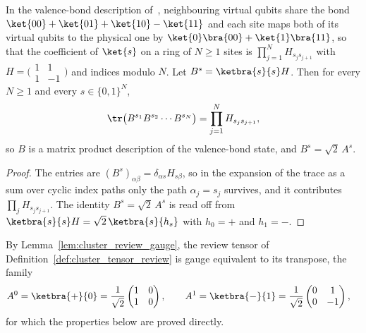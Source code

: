 \begin{lemma}\label{lem:cluster_valence_bond}
    \leanok
    In the valence-bond description of~\cite{VerstraeteCirac2004ValenceBond},
    neighbouring virtual qubits share the bond
    $\ket{00} + \ket{01} + \ket{10} - \ket{11}$ and each site maps both of its
    virtual qubits to the physical one by
    $\ket{0}\bra{00} + \ket{1}\bra{11}$, so that the coefficient of $\ket{s}$
    on a ring of $N \geq 1$ sites is $\prod_{j=1}^{N} H_{s_j s_{j+1}}$ with
    $H = \bigl(\begin{smallmatrix} 1 & 1 \\ 1 & -1 \end{smallmatrix}\bigr)$
    and indices modulo $N$. Let $B^s = \ketbra{s}{s} H$. Then for every
    $N \geq 1$ and every $s \in \{0,1\}^N$,
    \begin{align}
        \tr\bigl(B^{s_1} B^{s_2} \cdots B^{s_N}\bigr)
        = \prod_{j=1}^{N} H_{s_j s_{j+1}},
        \notag
    \end{align}
    so $B$ is a matrix product description of the valence-bond state, and
    $B^s = \sqrt{2}\,A^s$.
\end{lemma}

\begin{proof}
    \leanok
    The entries are $(B^s)_{\alpha\beta} = \delta_{\alpha s} H_{s\beta}$, so in
    the expansion of the trace as a sum over cyclic index paths only the path
    $\alpha_j = s_j$ survives, and it contributes
    $\prod_j H_{s_j s_{j+1}}$. The identity $B^s = \sqrt{2}\,A^s$ is read off
    from $\ketbra{s}{s}H = \sqrt{2}\,\ketbra{s}{h_s}$ with $h_0 = +$ and
    $h_1 = -$.
\end{proof}

\begin{definition}\label{def:cluster_tensor}
    \leanok
    By Lemma~\ref{lem:cluster_review_gauge}, the review tensor of
    Definition~\ref{def:cluster_tensor_review} is gauge equivalent to its
    transpose, the family
    \begin{align}
        A^0
         & = \ketbra{+}{0}
        = \frac{1}{\sqrt{2}}
        \begin{pmatrix} 1 & 0 \\ 1 & 0 \end{pmatrix},
        \qquad
        A^1
        = \ketbra{-}{1}
        = \frac{1}{\sqrt{2}}
        \begin{pmatrix} 0 & 1 \\ 0 & -1 \end{pmatrix},
        \notag
    \end{align}
    for which the properties below are proved directly.
\end{definition}


